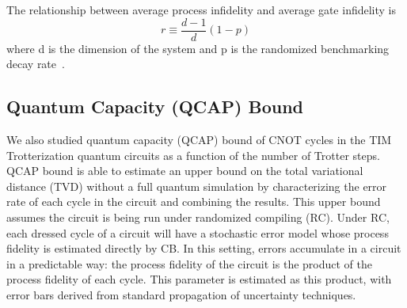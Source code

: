 The relationship between average process infidelity  and average gate infidelity is
\begin{equation}
    r\equiv \frac{d-1}{d}(1-p) \label{eq:err_rate}
\end{equation}
where d is the dimension of the system and p is the randomized benchmarking decay rate~\cite{Qi2019}. 





\subsection{Quantum Capacity (QCAP) Bound}

We also studied quantum capacity (QCAP) bound of CNOT cycles in the TIM Trotterization quantum circuits as a function of the number of Trotter steps. QCAP bound is able to estimate an upper bound on the total variational distance (TVD) without a full quantum simulation by characterizing the error rate of each cycle in the circuit and combining the results. This upper bound assumes the circuit is being run under randomized compiling (RC). Under RC, each dressed cycle of a circuit will have a stochastic error model whose process fidelity is estimated directly by CB. In this setting, errors accumulate in a circuit in a predictable way: the process fidelity of the circuit is the product of the process fidelity of each cycle. This parameter is estimated as this product, with error bars derived from standard propagation of uncertainty techniques. {\color{red}{KYA: Cite QB website.}} 







